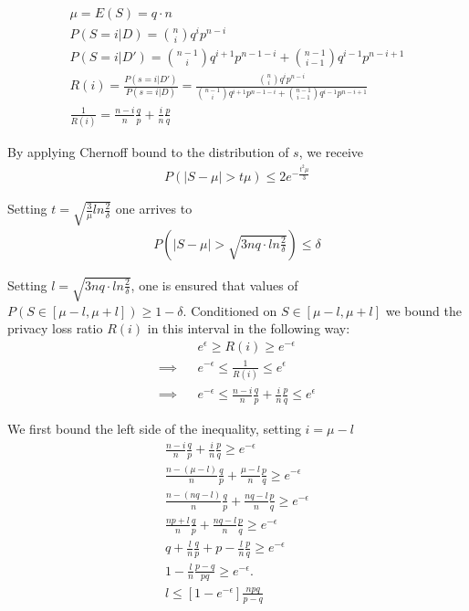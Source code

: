 \documentclass[11pt]{article}
\begin{document}
\begin{align}
\mu = E(S) = q \cdot n \\
P(S=i | D ) = \binom{n}{i}q^ip^{n-i} \\
P(S=i | D' ) = \binom{n-1}{i}q^{i+1}p^{n-1-i} +   \binom{n-1}{i-1}q^{i-1}p^{n-i+1}  \\
R(i)  = \frac{P(s=i | D')}{P(s=i | D)} = \frac{ \binom{n}{i}q^ip^{n-i} }{  \binom{n-1}{i}q^{i+1}p^{n-1-i} +   \binom{n-1}{i-1}q^{i-1}p^{n-i+1} } \\
\frac{1}{R(i)} =  \frac{n-i}{n}\frac{q}{p} + \frac{i}{n} \frac{p}{q}
\end{align}

By applying Chernoff bound to the distribution of $s$, we receive
 \begin{align}
P(|S - \mu| > t\mu) \le 2 e^{- \frac{t^2\mu}{3}}
\end{align}

Setting $t=\sqrt{\frac{3}{\mu} ln\frac{2}{\delta}}$ one arrives to
 \begin{align}
P \left (|S - \mu| >\sqrt{3nq \cdot ln\frac{2}{\delta}} \right ) \le \delta
\end{align}
 
Setting $l=\sqrt{3nq \cdot ln\frac{2}{\delta}}$, one is ensured that values of $P(S \in [\mu - l, \mu + l ]) \ge 1- \delta$. Conditioned on  $S \in [\mu - l, \mu + l ]$ we  bound the privacy loss ratio $R(i)$ in this interval in the following way:
\begin{align}
  && e^\epsilon \ge R(i) \ge e^{-\epsilon} \\ 
 \implies &&  e^{-\epsilon} \le \frac{1}{R(i)} \le e^\epsilon \\
  \implies &&  e^{-\epsilon} \le \frac{n-i}{n}\frac{q}{p} + \frac{i}{n} \frac{p}{q} \le e^\epsilon
\end{align}

We first bound the left side of the inequality, setting $i = \mu - l$
\begin{align}
\frac{n-i}{n}\frac{q}{p} + \frac{i}{n} \frac{p}{q} \ge e^{-\epsilon} \\
\frac{n-(\mu-l)}{n}\frac{q}{p} + \frac{\mu-l}{n} \frac{p}{q} \ge e^{-\epsilon} \\
\frac{n-(nq-l)}{n}\frac{q}{p} + \frac{nq-l}{n} \frac{p}{q} \ge e^{-\epsilon} \\
\frac{np + l}{n}\frac{q}{p} + \frac{nq-l}{n} \frac{p}{q} \ge e^{-\epsilon} \\
q + \frac{l}{n}\frac{q}{p} +  p - \frac{l}{n} \frac{p}{q} \ge e^{-\epsilon} \\
1 - \frac{l}{n} \frac{p-q}{pq}  \ge e^{-\epsilon}. \\
l \le \left [ 1 - e^{-\epsilon}\right ] \frac { npq}{p - q}  
\end{align}
\end{document}
